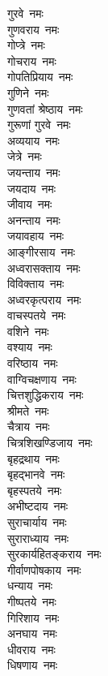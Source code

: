 \begin{flushleft}
\begin{multicols}{2}
गुरवे~नमः\\
गुणवराय~नमः\\
गोप्त्रे~नमः\\
गोचराय~नमः\\
गोपतिप्रियाय~नमः\\
गुणिने~नमः\\
गुणवतां श्रेष्ठाय~नमः\\
गुरूणां गुरवे~नमः\\
अव्ययाय~नमः\\
जेत्रे~नमः\hfill{}\\
जयन्ताय~नमः\\
जयदाय~नमः\\
जीवाय~नमः\\
अनन्ताय~नमः\\
जयावहाय~नमः\\
आङ्गीरसाय~नमः\\
अध्वरासक्ताय~नमः\\
विविक्ताय~नमः\\
अध्वरकृत्पराय~नमः\\
वाचस्पतये~नमः\hfill{}\\
वशिने~नमः\\
वश्याय~नमः\\
वरिष्ठाय~नमः\\
वाग्विचक्षणाय~नमः\\
चित्तशुद्धिकराय~नमः\\
श्रीमते~नमः\\
चैत्राय~नमः\\
चित्रशिखण्डिजाय~नमः\\
बृहद्रथाय~नमः\\
बृहद्भानवे~नमः\hfill{}\\
बृहस्पतये~नमः\\
अभीष्टदाय~नमः\\
सुराचार्याय~नमः\\
सुराराध्याय~नमः\\
सुरकार्यहितङ्कराय~नमः\\
गीर्वाणपोषकाय~नमः\\
धन्याय~नमः\\
गीष्पतये~नमः\\
गिरिशाय~नमः\\
अनघाय~नमः\hfill{}\\
धीवराय~नमः\\
धिषणाय~नमः\\

\end{multicols}
\end{flushleft}
